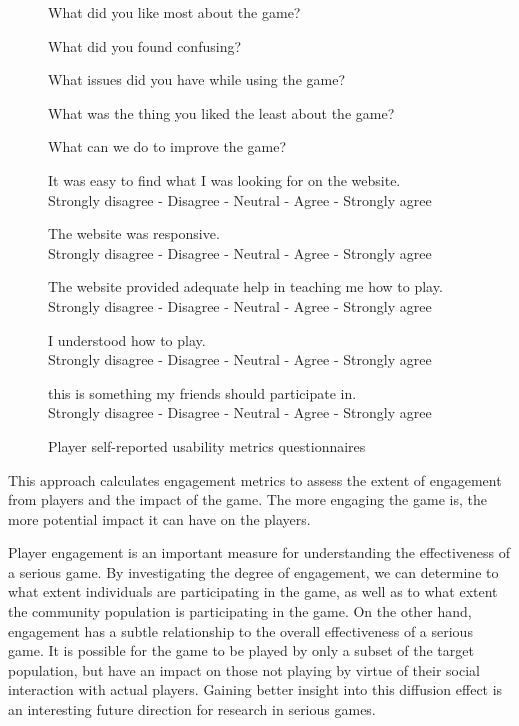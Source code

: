 \begin{figure}[ht!]
\begin{mybox}
\begin{compactenum}
\item What did you like most about the game?
\item What did you found confusing?
\item What issues did you have while using the game?
\item What was the thing you liked the least about the game?
\item What can we do to improve the game?
\item It was easy to find what I was looking for on the website.  \\
	Strongly disagree  -  Disagree  -  Neutral  -  Agree  -  Strongly agree
\item The website was responsive. \\
	Strongly disagree  -  Disagree  -  Neutral  -  Agree  -  Strongly agree
\item The website provided adequate help in teaching me how to play. \\
	Strongly disagree  -  Disagree  -  Neutral  -  Agree  -  Strongly agree
\item I understood how to play. \\
	Strongly disagree  -  Disagree  -  Neutral  -  Agree  -  Strongly agree
\item this is something my friends should participate in. \\
	Strongly disagree  -  Disagree  -  Neutral  -  Agree  -  Strongly agree
\end{compactenum}
\end{mybox}
\caption{Player self-reported usability metrics questionnaires}
\label{fig:usability-metrics}  
\end{figure}

\label{Engagement metrics}

This approach calculates engagement metrics to assess the extent of engagement from players and 
the impact of the game. The more engaging the game is, the more potential impact it can have on the players.

Player engagement is an important measure for understanding the effectiveness of a serious game.
By investigating the degree of engagement, we can determine to what extent individuals are
participating in the game, as well as to what extent the community population is participating in
the game. On the other hand, engagement has a subtle relationship to the overall effectiveness of a 
serious game. It is possible for the game to be played by only a subset of the target population, but
have an impact on those not playing by virtue of their social interaction with actual players. Gaining
better insight into this diffusion effect is an interesting future direction for research in serious games.

